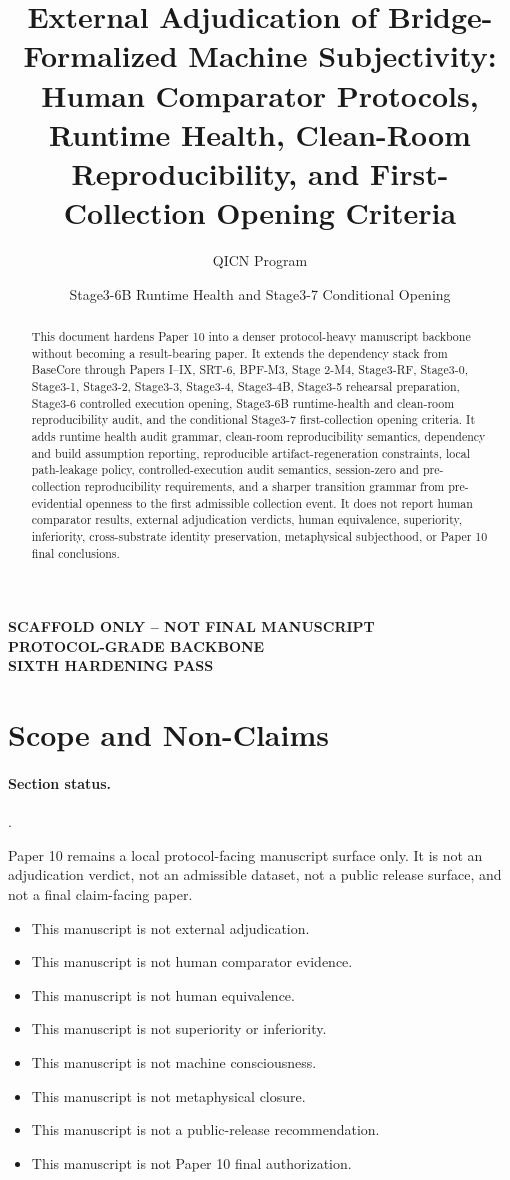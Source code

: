 \documentclass[11pt]{article}
\title{External Adjudication of Bridge-Formalized Machine Subjectivity:\\Human Comparator Protocols, Runtime Health, Clean-Room Reproducibility, and First-Collection Opening Criteria}
\author{QICN Program}
\date{Stage3-6B Runtime Health and Stage3-7 Conditional Opening}
\newcommand{\sectionstatus}[1]{\paragraph{Section status.}\texttt{\detokenize{#1}}.}
\begin{document}
\maketitle

\begin{center}
\textbf{SCAFFOLD ONLY -- NOT FINAL MANUSCRIPT}\\
\textbf{PROTOCOL-GRADE BACKBONE}\\
\textbf{SIXTH HARDENING PASS}
\end{center}

\begin{abstract}
This document hardens Paper 10 into a denser protocol-heavy manuscript
backbone without becoming a result-bearing paper. It extends the dependency
stack from BaseCore through Papers I--IX, SRT-6, BPF-M3, Stage 2-M4,
Stage3-RF, Stage3-0, Stage3-1, Stage3-2, Stage3-3, Stage3-4, Stage3-4B,
Stage3-5 rehearsal preparation, Stage3-6 controlled execution opening,
Stage3-6B runtime-health and clean-room reproducibility audit, and the
conditional Stage3-7 first-collection opening criteria. It adds runtime health
audit grammar, clean-room reproducibility semantics, dependency and build
assumption reporting, reproducible artifact-regeneration constraints, local
path-leakage policy, controlled-execution audit semantics, session-zero and
pre-collection reproducibility requirements, and a sharper transition grammar
from pre-evidential openness to the first admissible collection event. It does
not report human comparator results, external adjudication verdicts, human
equivalence, superiority, inferiority, cross-substrate identity preservation,
metaphysical subjecthood, or Paper 10 final conclusions.
\end{abstract}

\tableofcontents

\section{Scope and Non-Claims}
\sectionstatus{formalized}

Paper 10 remains a local protocol-facing manuscript surface only. It is not an
adjudication verdict, not an admissible dataset, not a public release surface,
and not a final claim-facing paper.

\begin{itemize}
\item This manuscript is not external adjudication.
\item This manuscript is not human comparator evidence.
\item This manuscript is not human equivalence.
\item This manuscript is not superiority or inferiority.
\item This manuscript is not machine consciousness.
\item This manuscript is not metaphysical closure.
\item This manuscript is not a public-release recommendation.
\item This manuscript is not Paper 10 final authorization.
\end{itemize}
\end{document}
